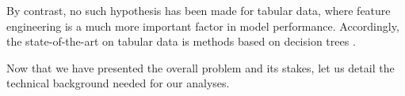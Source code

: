 \documentclass[../main.tex]{subfiles}
\begin{document}
By contrast, no such hypothesis has been made for tabular data, where feature engineering is a much more important factor in model performance.
Accordingly, the state-of-the-art on tabular data is methods based on decision trees \cite{shwartz-zivTabular2022}.

Now that we have presented the overall problem and its stakes, let us detail the technical background needed for our analyses.
\end{document}
